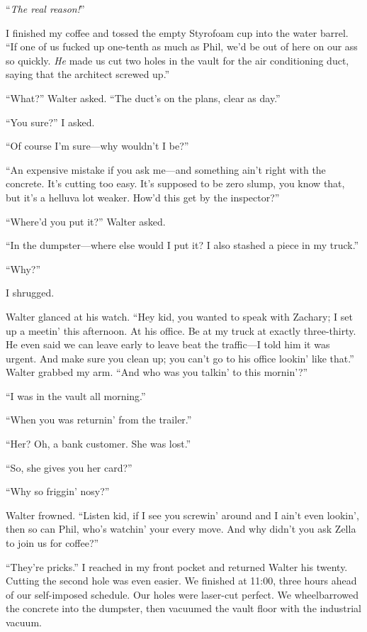 ``\emph{The real reason!}''

I finished my coffee and tossed the empty Styrofoam cup into the water
barrel. ``If one of us fucked up one-tenth as much as Phil, we'd be out
of here on our ass so quickly. \emph{He} made us cut two holes in the
vault for the air conditioning duct, saying that the architect screwed
up.''

``What?'' Walter asked. ``The duct's on the plans, clear as day.''

``You sure?'' I asked.

``Of course I'm sure---why wouldn't I be?''

``An expensive mistake if you ask me---and something ain't right with
the concrete. It's cutting too easy. It's supposed to be zero slump, you
know that, but it's a helluva lot weaker. How'd this get by the
inspector?''

``Where'd you put it?'' Walter asked.

``In the dumpster---where else would I put it? I also stashed a piece in
my truck.''

``Why?''

I shrugged.

Walter glanced at his watch. ``Hey kid, you wanted to speak with
Zachary; I set up a meetin' this afternoon. At his office. Be at my
truck at exactly three-thirty. He even said we can leave early to leave
beat the traffic---I told him it was urgent. And make sure you clean up;
you can't go to his office lookin' like that.'' Walter grabbed my arm.
``And who was you talkin' to this mornin'?''

``I was in the vault all morning.''

``When you was returnin' from the trailer.''

``Her? Oh, a bank customer. She was lost.''

``So, she gives you her card?''

``Why so friggin' nosy?''

Walter frowned. ``Listen kid, if I see you screwin' around and I ain't
even lookin', then so can Phil, who's watchin' your every move. And why
didn't you ask Zella to join us for coffee?''

``They're pricks.'' I reached in my front pocket and returned Walter his
twenty.\\

Cutting the second hole was even easier. We finished at 11:00, three
hours ahead of our self-imposed schedule. Our holes were laser-cut
perfect. We wheelbarrowed the concrete into the dumpster, then vacuumed
the vault floor with the industrial vacuum.

